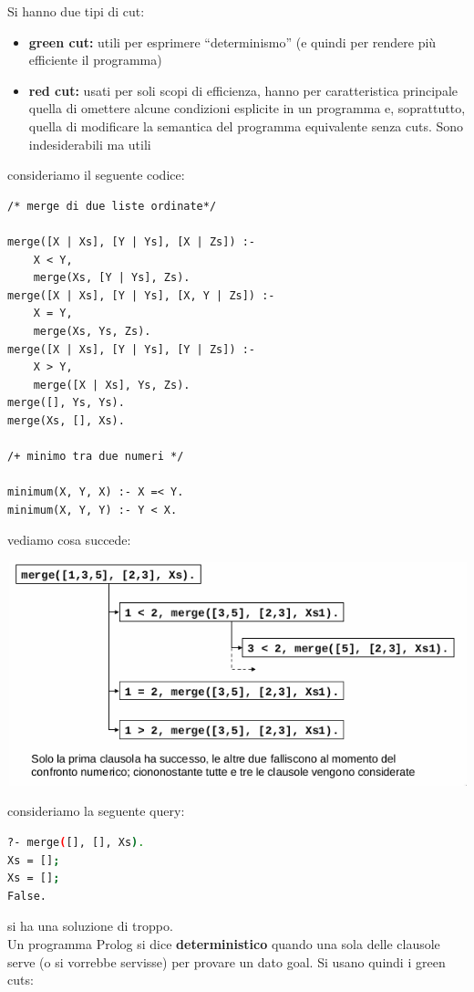 \documentclass[a4paper,12pt, oneside]{book}
\begin{document}
Si hanno due tipi di cut:
\begin{itemize}
\item \textbf{green cut: } utili per esprimere “determinismo” (e quindi per rendere più efficiente il programma)
\item \textbf{red cut: } usati per soli scopi di efficienza, hanno per caratteristica principale quella di omettere alcune condizioni esplicite in un programma e, soprattutto, quella di modificare la semantica del programma equivalente senza cuts. Sono indesiderabili ma utili
\end{itemize}
consideriamo il seguente codice:
\begin{verbatim}
/* merge di due liste ordinate*/

merge([X | Xs], [Y | Ys], [X | Zs]) :-
	X < Y,
	merge(Xs, [Y | Ys], Zs).
merge([X | Xs], [Y | Ys], [X, Y | Zs]) :-
	X = Y,
	merge(Xs, Ys, Zs).
merge([X | Xs], [Y | Ys], [Y | Zs]) :-
	X > Y,
	merge([X | Xs], Ys, Zs).
merge([], Ys, Ys).
merge(Xs, [], Xs).

/+ minimo tra due numeri */

minimum(X, Y, X) :- X =< Y.
minimum(X, Y, Y) :- Y < X.
\end{verbatim}
vediamo cosa succede:
\begin{center}
\includegraphics[scale=0.8]{img/cut2.png}
\end{center}
consideriamo la seguente query:
\begin{shaded}
\begin{lstlisting}[language=bash]
?- merge([], [], Xs).
Xs = [];
Xs = [];
False.
\end{lstlisting}
\end{shaded}
si ha una soluzione di troppo.\\
Un programma Prolog si dice \textbf{deterministico} quando una sola delle clausole serve (o si vorrebbe servisse) per provare un dato goal. Si usano quindi i green cuts:
\end{document}
